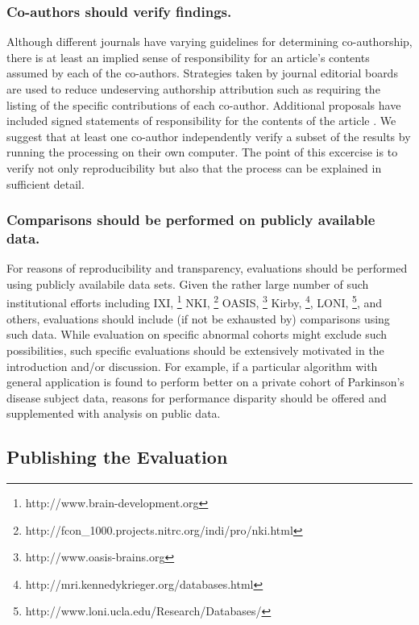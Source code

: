 \documentclass[final,5p,times,twocolumn]{elsarticle}
\begin{document}
\subsubsection{Co-authors should verify findings.}

Although different journals have varying guidelines for determining 
co-authorship, there is at least an implied sense of responsibility for
an article's contents assumed by each of the co-authors.  Strategies 
taken by journal editorial boards are used to reduce undeserving
authorship attribution such as requiring the listing of the specific 
contributions of each co-author.  Additional proposals have included
signed statements of responsibility for the contents of the article 
\cite{nature2007}.  We suggest that at least one co-author
independently verify a subset of the results by running the processing
on their own computer.   The point of this excercise is to verify not only
reproducibility but also that the process can be explained in
sufficient detail.

\subsubsection{Comparisons should be performed on publicly available data.}
For reasons of reproducibility and transparency, evaluations should be performed
using publicly availabile data sets.  Given the rather large number
of such institutional efforts including 
IXI,%
\footnote{
http://www.brain-development.org
}
NKI,%
\footnote{
http://fcon\_1000.projects.nitrc.org/indi/pro/nki.html
}
OASIS,%
\footnote{
http://www.oasis-brains.org
}
Kirby,%
\footnote{
http://mri.kennedykrieger.org/databases.html
},
LONI,%
\footnote{
http://www.loni.ucla.edu/Research/Databases/
}, and
others, evaluations should include (if not be exhausted by)
comparisons using such data.  While evaluation on specific abnormal cohorts
might exclude such possibilities, such specific evaluations should
be extensively motivated in the introduction and/or discussion.
For example, if a particular algorithm with general application is 
found to perform better
on a private cohort of Parkinson's disease subject data, reasons
for performance disparity should be offered and supplemented with
analysis on public data.

\subsection{Publishing the Evaluation}
\end{document}

